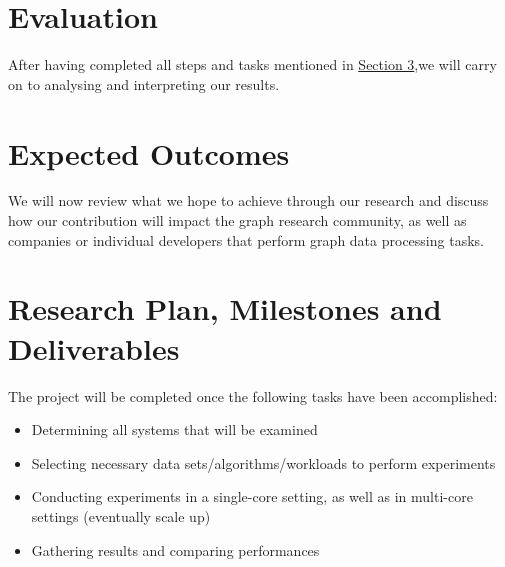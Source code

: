 \documentclass[a4paper,11pt]{article}
\begin{document}
\section{Evaluation} \label{evaluation}

After having completed all steps and tasks mentioned in \hyperref[methodology]{Section 3},we will carry on to analysing and interpreting our results.


\section{Expected Outcomes} \label{outcomes}

We will now review what we hope to achieve through our research and discuss how our contribution will impact the graph research community, as well as companies or individual developers that perform graph data processing tasks.




\section{Research Plan, Milestones and Deliverables} \label{milestones}


The project will be completed once the following tasks have been accomplished:
\begin{itemize}
    \item Determining all systems that will be examined
    \item Selecting necessary data sets/algorithms/workloads to perform experiments
    \item Conducting experiments in a single-core setting, as well as in multi-core settings (eventually scale up)
    \item Gathering results and comparing performances
    
\end{itemize}
\end{document}
